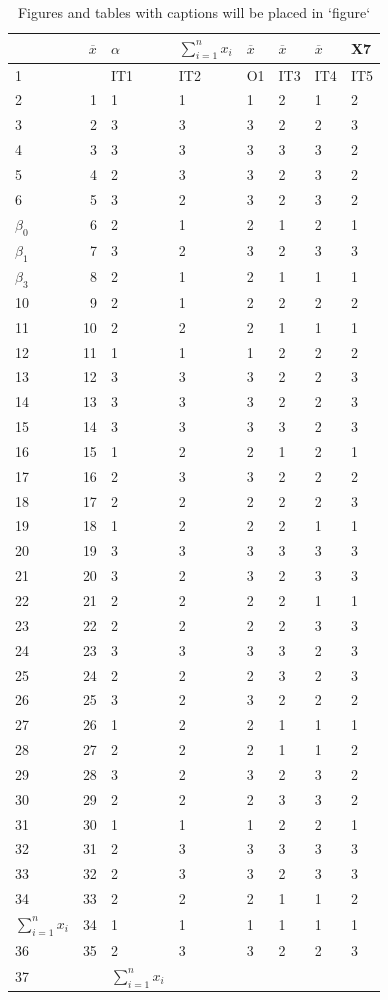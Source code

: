 \documentclass[10pt,]{krantz}
\theoremstyle{definition}
\theoremstyle{definition}
\theoremstyle{definition}
\theoremstyle{definition}
\theoremstyle{remark}
\begin{document}
\begin{longtable}[t]{lrllllll}
\caption{\label{tab:unnamed-chunk-46}Figures and tables with captions will be placed in `figure`}\\
\toprule
  & $\overline{x}$ & $\alpha$ & $\sum^{n}_{i=1}{x_i}$ & $\overline{x}$ & $\overline{x}$ & $\overline{x}$ & X7\\
\midrule
1 &  & IT1 & IT2 & O1 & IT3 & IT4 & IT5\\
2 & 1 & 1 & 1 & 1 & 2 & 1 & 2\\
3 & 2 & 3 & 3 & 3 & 2 & 2 & 3\\
4 & 3 & 3 & 3 & 3 & 3 & 3 & 2\\
5 & 4 & 2 & 3 & 3 & 2 & 3 & 2\\
6 & 5 & 3 & 2 & 3 & 2 & 3 & 2\\
$\beta_0$ & 6 & 2 & 1 & 2 & 1 & 2 & 1\\
$\beta_1$ & 7 & 3 & 2 & 3 & 2 & 3 & 3\\
$\beta_3$ & 8 & 2 & 1 & 2 & 1 & 1 & 1\\
10 & 9 & 2 & 1 & 2 & 2 & 2 & 2\\
11 & 10 & 2 & 2 & 2 & 1 & 1 & 1\\
12 & 11 & 1 & 1 & 1 & 2 & 2 & 2\\
13 & 12 & 3 & 3 & 3 & 2 & 2 & 3\\
14 & 13 & 3 & 3 & 3 & 2 & 2 & 3\\
15 & 14 & 3 & 3 & 3 & 3 & 2 & 3\\
16 & 15 & 1 & 2 & 2 & 1 & 2 & 1\\
17 & 16 & 2 & 3 & 3 & 2 & 2 & 2\\
18 & 17 & 2 & 2 & 2 & 2 & 2 & 3\\
19 & 18 & 1 & 2 & 2 & 2 & 1 & 1\\
20 & 19 & 3 & 3 & 3 & 3 & 3 & 3\\
21 & 20 & 3 & 2 & 3 & 2 & 3 & 3\\
22 & 21 & 2 & 2 & 2 & 2 & 1 & 1\\
23 & 22 & 2 & 2 & 2 & 2 & 3 & 3\\
24 & 23 & 3 & 3 & 3 & 3 & 2 & 3\\
25 & 24 & 2 & 2 & 2 & 3 & 2 & 3\\
26 & 25 & 3 & 2 & 3 & 2 & 2 & 2\\
27 & 26 & 1 & 2 & 2 & 1 & 1 & 1\\
28 & 27 & 2 & 2 & 2 & 1 & 1 & 2\\
29 & 28 & 3 & 2 & 3 & 2 & 3 & 2\\
30 & 29 & 2 & 2 & 2 & 3 & 3 & 2\\
31 & 30 & 1 & 1 & 1 & 2 & 2 & 1\\
32 & 31 & 2 & 3 & 3 & 3 & 3 & 3\\
33 & 32 & 2 & 3 & 3 & 2 & 3 & 3\\
34 & 33 & 2 & 2 & 2 & 1 & 1 & 2\\
$\sum^{n}_{i=1}{x_i}$ & 34 & 1 & 1 & 1 & 1 & 1 & 1\\
36 & 35 & 2 & 3 & 3 & 2 & 2 & 3\\
37 &  & $\sum_{i=1}^nx_i$ &  &  &  &  & \\
\bottomrule
\end{longtable}



\printindex
\end{document}
